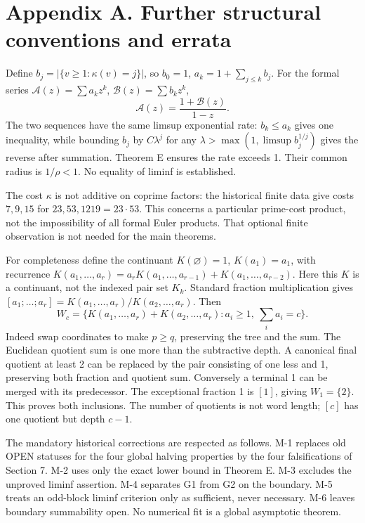 \documentclass[11pt]{article}
\begin{document}
\section*{Appendix A. Further structural conventions and errata}

Define \(b_j=|\{v\ge1:\kappa(v)=j\}|\), so \(b_0=1\), \(a_k=1+\sum_{j\le k}b_j\). For the formal series \(\mathcal A(z)=\sum a_kz^k\), \(\mathcal B(z)=\sum b_kz^k\),
\[
\mathcal A(z)=\frac{1+\mathcal B(z)}{1-z}.
\]
The two sequences have the same limsup exponential rate: \(b_k\le a_k\) gives one inequality, while bounding \(b_j\) by \(C\lambda^j\) for any \(\lambda>\max(1,\limsup b_j^{1/j})\) gives the reverse after summation. Theorem E ensures the rate exceeds 1. Their common radius is \(1/\rho<1\). No equality of liminf is established.

The cost \(\kappa\) is not additive on coprime factors: the historical finite data give costs \(7,9,15\) for \(23,53,1219=23\cdot53\). This concerns a particular prime-cost product, not the impossibility of all formal Euler products. That optional finite observation is not needed for the main theorems.

For completeness define the continuant \(K(\varnothing)=1\), \(K(a_1)=a_1\), with recurrence \(K(a_1,\ldots,a_r)=a_rK(a_1,\ldots,a_{r-1})+K(a_1,\ldots,a_{r-2})\). Here this \(K\) is a continuant, not the indexed pair set \(K_k\). Standard fraction multiplication gives \([a_1;\ldots;a_r]=K(a_1,\ldots,a_r)/K(a_2,\ldots,a_r)\). Then
\[
W_c=\{K(a_1,\ldots,a_r)+K(a_2,\ldots,a_r):a_i\ge1,\ \sum_i a_i=c\}.
\]
Indeed swap coordinates to make \(p\ge q\), preserving the tree and the sum. The Euclidean quotient sum is one more than the subtractive depth. A canonical final quotient at least 2 can be replaced by the pair consisting of one less and 1, preserving both fraction and quotient sum. Conversely a terminal 1 can be merged with its predecessor. The exceptional fraction 1 is \([1]\), giving \(W_1=\{2\}\). This proves both inclusions. The number of quotients is not word length; \([c]\) has one quotient but depth \(c-1\).

The mandatory historical corrections are respected as follows. M-1 replaces old OPEN statuses for the four global halving properties by the four falsifications of Section 7. M-2 uses only the exact lower bound in Theorem E. M-3 excludes the unproved liminf assertion. M-4 separates G1 from G2 on the boundary. M-5 treats an odd-block liminf criterion only as sufficient, never necessary. M-6 leaves boundary summability open. No numerical fit is a global asymptotic theorem.
\end{document}
